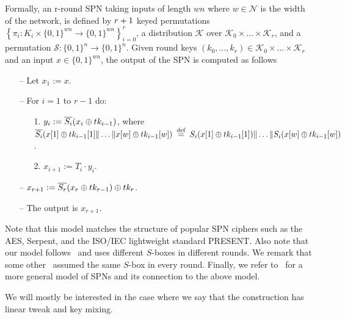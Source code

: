 Formally, an r-round SPN taking inputs of length $w n$ where $w \in \mathcal{N}$ is the width of the network, is defined by $\mathnormal{r}+1$ keyed permutations $\left\{\pi_{i}: K_{i} \times\{0,1\}^{w n} \rightarrow\{0,1\}^{w n}\right\}_{i=0}^{r}$, a distribution $\mathcal{K}$ over $\mathcal{K}_{0} \times \dots \times \mathcal{K}_{r}$, and a permutation $\mathcal{S}:\{0,1\}^{n} \rightarrow \{0,1\}^{n}$. Given round keys $(k_{0},\dots, k_{r}) \in \mathcal{K}_{0} \times \dots \times \mathcal{K}_{r}$ and an input $x \in \{0,1\}^{w n}$, the output of the SPN is computed as follows

\begin{itemize}
  \item[--]
  Let $x_1 := x$.
  \item[--]
  For $i = 1$ to $r-1$ do:
  \begin{itemize}
  	\item[1.] $y_{i} := \overline{S_i}(x_{i}\oplus tk_{i-1})$, where $\overline{S_i}(x[1]\oplus tk_{i-1}[1]\|\ldots\| x[w]\oplus tk_{i-1}[w]) \stackrel{\text { def }}{=} S_i(x[1]\oplus tk_{i-1}[1])\|\ldots\| S_i(x[w]\oplus tk_{i-1}[w])$.
    \item[2.] 
    $x_{i + 1} := T_i\cdot y_i$.
  \end{itemize}
  \item[--] $x_{r+1} := \overline{S_r}(x_r\oplus tk_{r-1})\oplus tk_r$.
  \item[--]
  The output is $x_{r+1}$.
\end{itemize}

Note that this model matches the structure of popular SPN ciphers such as the AES, Serpent, and the ISO/IEC lightweight standard PRESENT. Also note that our model follows~\cite[Sect. 4.2]{C:CDKLST18} and uses different $S$-boxes in different rounds. We remark that some other~\cite[Sect. 3]{C:CDKLST18} assumed the same $S$-box in every round. Finally, we refer to~\cite[Sect. 2.1]{EPRINT:DKSTZ17} for a more general model of SPNs and its connection to the above model.



We will mostly be interested in the case where
we say that the construction has linear tweak and key mixing.









